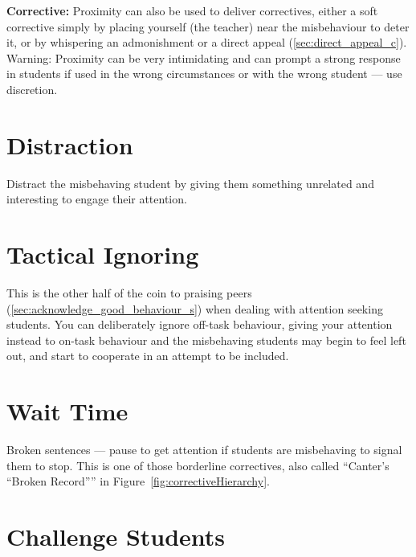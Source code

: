 \documentclass[12pt]{report}
\begin{document}
\textbf{Corrective:} Proximity can also be used to deliver correctives, either a soft corrective simply by placing yourself (the teacher) near the misbehaviour to deter it\footnotemark, or by whispering an admonishment or a direct appeal (\ref{sec:direct_appeal_c}). Warning: Proximity can be very intimidating and can prompt a strong response in students if used in the wrong circumstances or with the wrong student --- use discretion.


\section{Distraction}
\label{sec:distraction_s}

Distract the misbehaving student by giving them something unrelated and interesting to engage their attention.



\section{Tactical Ignoring}
\label{sec:tactical_ignoring_s}

This is the other half of the coin to praising peers (\ref{sec:acknowledge_good_behaviour_s}) when dealing with attention seeking students. You can deliberately ignore off-task behaviour, giving your attention instead to on-task behaviour and the misbehaving students may begin to feel left out, and start to cooperate in an attempt to be included.



\section{Wait Time}
\label{sec:wait_time_s}

Broken sentences --- pause to get attention if students are misbehaving to signal them to stop. This is one of those borderline correctives, also called ``Canter's ``Broken Record'''' in Figure~\ref{fig:correctiveHierarchy}.


\section{Challenge Students}
\label{sec:challenge_s}
\end{document}
